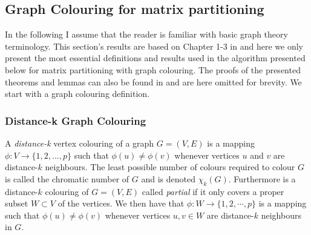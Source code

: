 	\subsection{Graph Colouring for matrix partitioning}
	\label{sec:partitioning}
	In the following I assume that the reader is familiar with basic graph theory
	terminology.
	This section's results are based on Chapter 1-3 in \cite{Jacobian} and here
	we  only present the most essential definitions and results used in the
	algorithm presented
	below for matrix partitioning with graph colouring. The proofs of the presented
	theorems and lemmas
	can also be found in \cite{Jacobian} and are here omitted for brevity.
	We start with a graph colouring definition.
	\subsubsection*{Distance-k Graph Colouring}
	\begin{definition}
		A \textit{distance-k} vertex colouring of a graph $G = (V,E)$ is a mapping $\phi
		: V \to \{1,2,..., p\}$ such that $\phi(u) \not= \phi(v)$ whenever vertices $u$
		and $v$ are distance-$k$ neighbours. The least possible number of colours
		required to colour $G$ is called the chromatic number of $G$ and is denoted
		$\chi_k(G)$. Furthermore is a distance-$k$ colouring of $G = (V,E)$ called
		\emph{partial} if it only covers a proper subset $W \subset V$ of the vertices.
		We then have that $\phi: W \to \{1,2, \cdots, p\}$ is a mapping such that
		$\phi(u) \not= \phi(v)$ whenever vertices $u, v \in W$ are distance-$k$
		neighbours in $G$.
	\end{definition}


